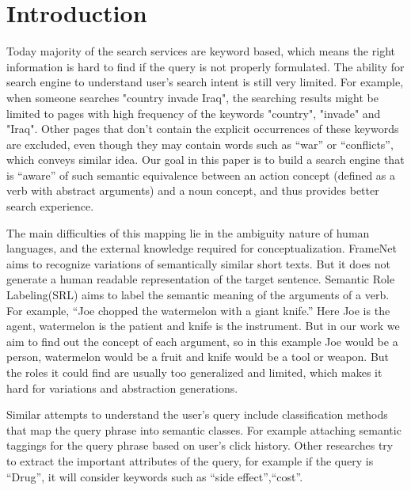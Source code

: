 \section{Introduction}
Today majority of the search services are keyword based,
which means the right information is hard to find if the query is
not properly formulated. The ability for search engine to understand
user's search intent is still very limited.
For example, when someone searches "country invade Iraq", 
the searching results might be limited to pages with 
high frequency of the keywords "country", "invade" and "Iraq". 
Other pages that don't contain the explicit occurrences of these
keywords are excluded, even though they may contain words 
such as ``war'' or ``conflicts'', which conveys similar idea. 
Our goal in this paper is to build a search engine that 
is ``aware'' of such semantic equivalence between an action concept
(defined as a verb with abstract arguments)
and a noun concept, and thus provides better search experience.


The main difficulties of this mapping lie in the ambiguity nature of human 
languages, and the external knowledge required for conceptualization. FrameNet \cite{baker1998berkeley}
aims to recognize variations of semantically similar short texts. But it does not generate
a human readable representation of the target sentence. Semantic Role Labeling(SRL)
\cite{palmer2005proposition}aims to label the semantic meaning of the arguments of a verb. For example, ``Joe chopped the watermelon with
a giant knife.'' Here Joe is the agent, watermelon is the patient and knife is the instrument.
But in our work we aim to find out the concept of each argument, so in this example
Joe would be a person, watermelon would be a fruit and knife would be a tool or weapon.
But the roles it could find are usually too generalized and limited, which makes it hard
for variations and abstraction generations.

Similar attempts to understand the user's query include classification methods that 
map the query phrase into semantic classes.\cite{demartini2013crowdq,arguello2009sources}
For example attaching semantic taggings for the query phrase based on user's click history.
\cite{manshadi2009semantic}
Other researches\cite{pasca2008weakly} try to extract the important attributes of the query, for example if 
the query is ``Drug'', it will consider keywords such as ``side effect'',``cost''.

